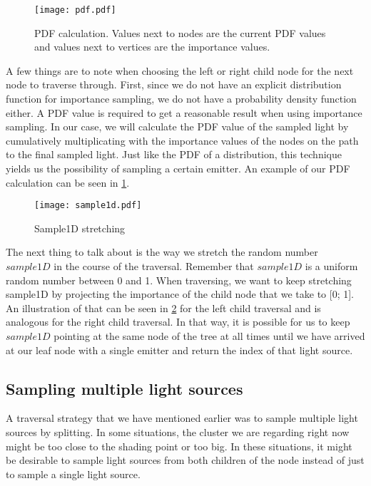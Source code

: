 \begin{figure}
	\begin{center}
		\texttt{[image: pdf.pdf]}
		\caption{PDF calculation. Values next to nodes are the current PDF values and values next to vertices are the importance values.}
		\label{fig:pdf}
	\end{center}
\end{figure}

A few things are to note when choosing the left or right child node for the next node to traverse through. First, since we do not have an explicit distribution function for importance sampling, we do not have a probability density function either. A PDF value is required to get a reasonable result when using importance sampling. In our case, we will calculate the PDF value of the sampled light by cumulatively multiplicating with the importance values of the nodes on the path to the final sampled light. Just like the PDF of a distribution, this technique yields us the possibility of sampling a certain emitter. An example of our PDF calculation can be seen in \ref{fig:pdf}.

\begin{figure}
	\begin{center}
		\texttt{[image: sample1d.pdf]}
		\caption{Sample1D stretching}
		\label{fig:sample1d}
	\end{center}
\end{figure}


The next thing to talk about is the way we stretch the random number $sample1D$ in the course of the traversal. Remember that $sample1D$ is a uniform random number between 0 and 1. When traversing, we want to keep stretching sample1D by projecting the importance of the child node that we take to [0; 1]. An illustration of that can be seen in \ref{fig:sample1d} for the left child traversal and is analogous for the right child traversal. In that way, it is possible for us to keep $sample1D$ pointing at the same node of the tree at all times until we have arrived at our leaf node with a single emitter and return the index of that light source.

\subsection{Sampling multiple light sources}
\label{subs:mult}

A traversal strategy that we have mentioned earlier was to sample multiple light sources by splitting. In some situations, the cluster we are regarding right now might be too close to the shading point or too big. In these situations, it might be desirable to sample light sources from both children of the node instead of just to sample a single light source.

